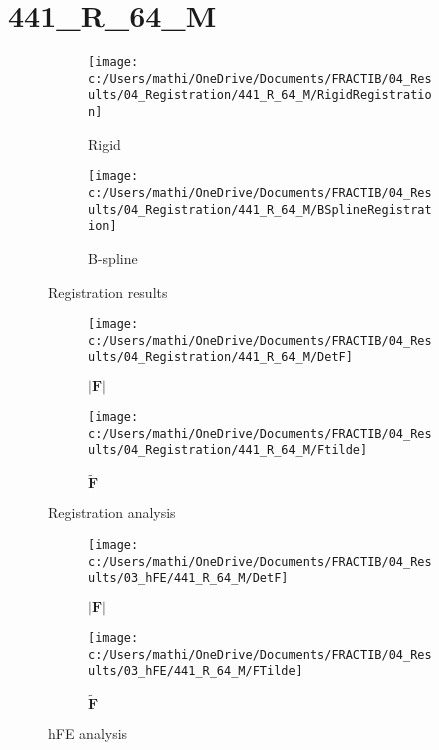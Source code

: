\documentclass{article}%
\begin{document}
%
\newpage%
\section*{441\_R\_64\_M}%
\label{sec:441R64M}%


\begin{figure}[h!]%
\begin{subfigure}[b]{0.5\linewidth}%
\texttt{[image: c:/Users/mathi/OneDrive/Documents/FRACTIB/04\_Results/04\_Registration/441\_R\_64\_M/RigidRegistration]}%
\caption{Rigid}%
\end{subfigure}%
\begin{subfigure}[b]{0.5\linewidth}%
\texttt{[image: c:/Users/mathi/OneDrive/Documents/FRACTIB/04\_Results/04\_Registration/441\_R\_64\_M/BSplineRegistration]}%
\caption{B{-}spline}%
\end{subfigure}%
\caption{Registration results}%
\end{figure}

%


\begin{figure}[h!]%
\begin{subfigure}[b]{0.5\linewidth}%
\texttt{[image: c:/Users/mathi/OneDrive/Documents/FRACTIB/04\_Results/04\_Registration/441\_R\_64\_M/DetF]}%
\caption{$|\mathbf{F}|$}%
\end{subfigure}%
\begin{subfigure}[b]{0.5\linewidth}%
\texttt{[image: c:/Users/mathi/OneDrive/Documents/FRACTIB/04\_Results/04\_Registration/441\_R\_64\_M/Ftilde]}%
\caption{$\tilde{\mathbf{F}}$}%
\end{subfigure}%
\caption{Registration analysis}%
\end{figure}

%


\begin{figure}[h!]%
\begin{subfigure}[b]{0.5\linewidth}%
\texttt{[image: c:/Users/mathi/OneDrive/Documents/FRACTIB/04\_Results/03\_hFE/441\_R\_64\_M/DetF]}%
\caption{$|\mathbf{F}|$}%
\end{subfigure}%
\begin{subfigure}[b]{0.5\linewidth}%
\texttt{[image: c:/Users/mathi/OneDrive/Documents/FRACTIB/04\_Results/03\_hFE/441\_R\_64\_M/FTilde]}%
\caption{$\tilde{\mathbf{F}}$}%
\end{subfigure}%
\caption{hFE analysis}%
\end{figure}
\end{document}
